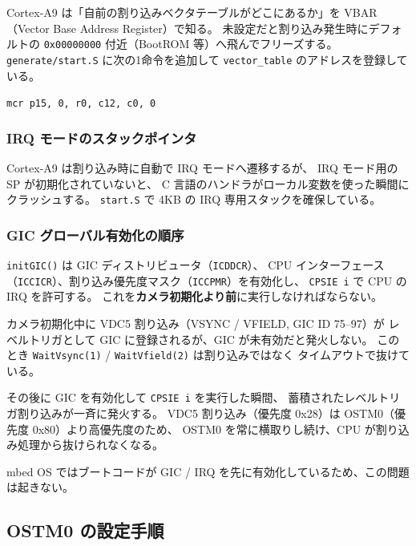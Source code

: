 \documentclass[a4paper,11pt,dvipdfmx]{jsarticle}
\begin{document}
Cortex-A9 は「自前の割り込みベクタテーブルがどこにあるか」を
VBAR（Vector Base Address Register）で知る。
未設定だと割り込み発生時にデフォルトの \texttt{0x00000000} 付近（BootROM 等）へ飛んでフリーズする。
\texttt{generate/start.S} に次の1命令を追加して \texttt{vector\_table} のアドレスを登録している。

\begin{center}
\texttt{mcr p15, 0, r0, c12, c0, 0}
\end{center}

\subsubsection{IRQ モードのスタックポインタ}

Cortex-A9 は割り込み時に自動で IRQ モードへ遷移するが、
IRQ モード用の SP が初期化されていないと、
C 言語のハンドラがローカル変数を使った瞬間にクラッシュする。
\texttt{start.S} で 4KB の IRQ 専用スタックを確保している。

\subsubsection{GIC グローバル有効化の順序}

\texttt{initGIC()} は GIC ディストリビュータ（\texttt{ICDDCR}）、
CPU インターフェース（\texttt{ICCICR}）、割り込み優先度マスク（\texttt{ICCPMR}）を有効化し、
\texttt{CPSIE i} で CPU の IRQ を許可する。
これを\textbf{カメラ初期化より前}に実行しなければならない。

\begin{cautionbox}[順序を誤ると割り込みストームでハングする]
カメラ初期化中に VDC5 割り込み（VSYNC / VFIELD, GIC ID 75--97）が
レベルトリガとして GIC に登録されるが、GIC が未有効だと発火しない。
このとき \texttt{WaitVsync(1)} / \texttt{WaitVfield(2)} は割り込みではなく
タイムアウトで抜けている。

その後に GIC を有効化して \texttt{CPSIE i} を実行した瞬間、
蓄積されたレベルトリガ割り込みが一斉に発火する。
VDC5 割り込み（優先度 0x28）は OSTM0（優先度 0x80）より高優先度のため、
OSTM0 を常に横取りし続け、CPU が割り込み処理から抜けられなくなる。

mbed OS ではブートコードが GIC / IRQ を先に有効化しているため、この問題は起きない。
\end{cautionbox}

\subsection{OSTM0 の設定手順}\label{sec:ostm}
\end{document}

